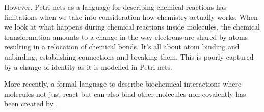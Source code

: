 However, Petri nets as a language for describing chemical reactions
has limitations when we take into consideration
how chemistry actually works.
When we look at what happens during chemical reactions
inside molecules, the chemical transformation amounts to
a change in the way electrons are shared by atoms
resulting in a relocation of chemical bonds.
It's all about atom binding and unbinding,
establishing connections and breaking them.
This is poorly captured by a change  of identity
as it is modelled in Petri nets.

More recently,
a formal language to describe biochemical interactions
where molecules not just react but can also bind other molecules
non-covalently has been created by \citet{danoslaneve2002a}.


















